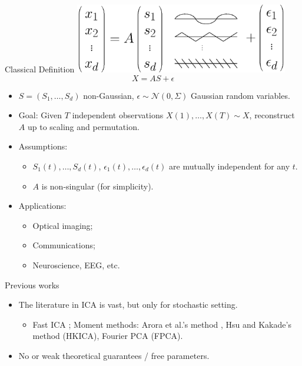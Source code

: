 \documentclass[final]{beamer} %
\newcommand{\eps}{\epsilon}
\begin{document}
\begin{frame}[c]
\begin{columns}[t,totalwidth=\textwidth]
\begin{column}{.24\textwidth}
	
		\begin{block}{Classical Definition}
			\centering
			\includegraphics[width=0.7\textwidth]{ICA_model.eps}
			\begin{equation*}
				\label{eq:stoch-ICA}
				X = AS+\epsilon
			\end{equation*}
			\vspace{-1.5cm}
			\begin{itemize}
				\item $S = (S_1,\ldots, S_d)$ non-Gaussian, $\eps \sim \mathcal{N}(0,\Sigma)$ Gaussian random variables.
				\item Goal: Given $T$ independent observations $X(1), \ldots, X(T) \sim X$, reconstruct $A$ up to scaling and permutation.
\item Assumptions:
                          \begin{itemize}
				\item $S_1(t),\ldots, S_d(t)$, $\eps_1(t), \ldots, \eps_d(t)$ are mutually independent for any $t$.
				\item $A$ is non-singular
                                  (for simplicity). 
                             \end{itemize}
				\item Applications:
				\begin{itemize}
						\item Optical imaging;
						\item Communications;
						\item Neuroscience, EEG, etc.
				\end{itemize}				
			\end{itemize}	
\end{block}


			
		\begin{block}{Previous works}
		\vspace{-0.5cm}
			\begin{itemize}
				\item The literature in ICA is vast, but only for stochastic setting.
				\begin{itemize}
					\item Fast ICA \citep{hyvarinen1999fast}; Moment methods:
					Arora et al.'s method \citep{arora2012provable},
					Hsu and Kakade's method \citep{hsu2013learning} (HKICA), 
					Fourier PCA \citep{goyal2014fourier} (FPCA).	
				\end{itemize}
				\item No or weak theoretical guarantees / free parameters. %
			\end{itemize}
		\end{block}


\end{column}
\end{columns}
\end{frame}
\end{document}

